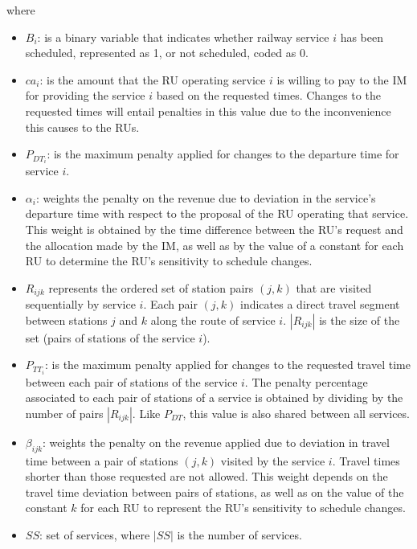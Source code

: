 \documentclass[Afour,sagev,times]{sagej}
\begin{document}
where \begin{itemize}
    \item $B_i$: is a binary variable that indicates whether railway service $i$ has been scheduled, represented as 1, or not scheduled, coded as 0. 
    \item $ca_i$: is the amount that the \gls{RU} operating service $i$ is willing to pay to the \gls{IM} for providing the service $i$ based on the requested times. Changes to the requested times will entail penalties in this value due to the inconvenience this causes to the \glspl{RU}.
    \item $P_{DT_{i}}$: is the maximum penalty applied for changes to the departure time for service $i$.
    \item $\alpha_{i}$: weights the penalty on the revenue due to deviation in the service's departure time with respect to the proposal of the \gls{RU} operating that service. This weight is obtained by the time difference between the \gls{RU}'s request and the allocation made by the \gls{IM}, as well as by the value of a constant for each \gls{RU} to determine the \gls{RU}'s sensitivity to schedule changes.
    \item $ R_{ijk} $ represents the ordered set of station pairs $ (j,k) $ that are visited sequentially by service $i$. Each pair $(j,k)$ indicates a direct travel segment between stations $j$ and $k$ along the route of service $i$. $|R_{ijk}|$ is the size of the set (pairs of stations of the service $i$).
    \item $P_{TT_{i}}$: is the maximum penalty applied for changes to the requested travel time between each pair of stations of the service $i$. The penalty percentage associated to each pair of stations of a service is obtained by dividing by the number of pairs $|R_{ijk}|$. Like $P_{DT}$, this value is also shared between all services.
    \item $\beta_{ijk}$: weights the penalty on the revenue applied due to deviation in travel time between a pair of stations $(j,k)$ visited by the service $i$. Travel times shorter than those requested are not allowed. This weight depends on the travel time deviation between pairs of stations, as well as on the value of the constant $k$ for each \gls{RU} to represent the \gls{RU}'s sensitivity to schedule changes.
    \item $ SS $: set of services, where $ |SS| $ is the number of services.
\end{itemize}
\end{document}
